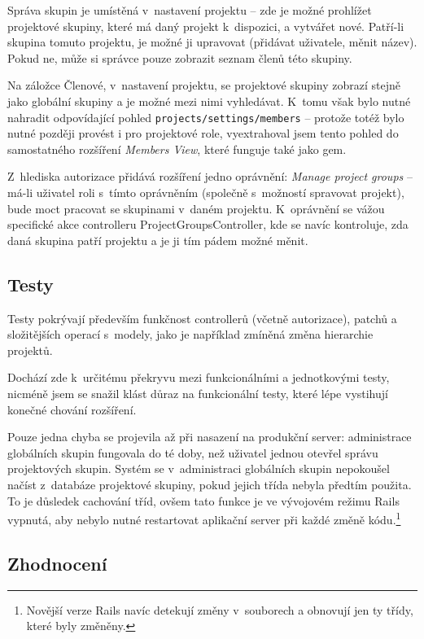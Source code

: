 \documentclass[thesis=B,czech]{FITthesis}[2012/05/02]
\begin{document}
Správa skupin je umístěná v~nastavení projektu -- zde je možné prohlížet
projektové skupiny, které má daný projekt k~dispozici, a vytvářet nové.
Patří-li skupina tomuto projektu, je možné ji upravovat (přidávat
uživatele, měnit název). Pokud ne, může si správce pouze zobrazit seznam
členů této skupiny.

Na záložce Členové, v~nastavení projektu, se projektové skupiny zobrazí
stejně jako globální skupiny a je možné mezi nimi vyhledávat. K~tomu
však bylo nutné nahradit odpovídající pohled
\lstinline!projects/settings/members! -- protože totéž bylo nutné
později provést i pro projektové role, vyextrahoval jsem tento pohled do
samostatného rozšíření \emph{Members View},
které funguje také jako \gls{gem}.

Z~hlediska autorizace přidává rozšíření jedno oprávnění: \emph{Manage
project groups} -- má-li uživatel roli s~tímto oprávněním (společně
s~možností spravovat projekt), bude moct pracovat se skupinami v~daném
projektu. K~oprávnění se vážou specifické akce controlleru
ProjectGroupsController, kde se navíc kontroluje, zda daná skupina patří
projektu a je ji tím pádem možné měnit.

\subsection{Testy}

Testy pokrývají především funkčnost controllerů (včetně autorizace),
patchů a složitějších operací s~modely, jako je například zmíněná změna
hierarchie projektů.

Dochází zde k~určitému překryvu mezi funkcionálními a jednotkovými testy, nicméně
jsem se snažil klást důraz na funkcionální testy, které lépe vystihují
konečné chování rozšíření.

Pouze jedna chyba se projevila až při nasazení na produkční server:
administrace globálních skupin fungovala do té doby, než uživatel jednou
otevřel správu projektových skupin. Systém se v~administraci globálních
skupin \mbox{nepokoušel} načíst z~databáze projektové skupiny, pokud jejich
třída nebyla předtím použita. To je důsledek cachování tříd, ovšem tato funkce je
ve vývojovém režimu Rails vypnutá, aby nebylo nutné restartovat
aplikační server při každé změně kódu.\footnote{Novější verze Rails navíc
  detekují změny v~souborech a obnovují jen ty třídy, které byly
  změněny.}

\subsection{Zhodnocení}
\end{document}
